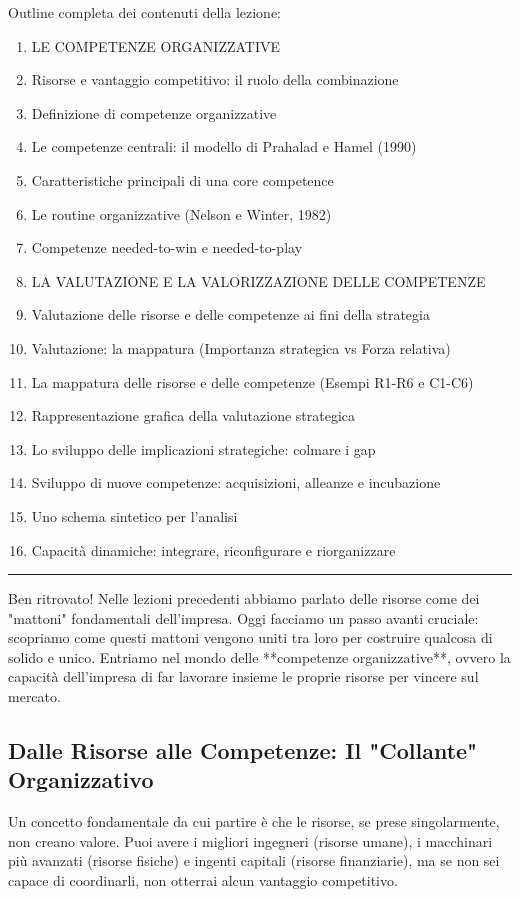\documentclass[a4paper,10pt]{article}
\begin{document}
Outline completa dei contenuti della lezione:
{\small
\begin{enumerate}
\item LE COMPETENZE ORGANIZZATIVE
\item Risorse e vantaggio competitivo: il ruolo della combinazione
\item Definizione di competenze organizzative
\item Le competenze centrali: il modello di Prahalad e Hamel (1990)
\item Caratteristiche principali di una core competence
\item Le routine organizzative (Nelson e Winter, 1982)
\item Competenze needed-to-win e needed-to-play
\item LA VALUTAZIONE E LA VALORIZZAZIONE DELLE COMPETENZE
\item Valutazione delle risorse e delle competenze ai fini della strategia
\item Valutazione: la mappatura (Importanza strategica vs Forza relativa)
\item La mappatura delle risorse e delle competenze (Esempi R1-R6 e C1-C6)
\item Rappresentazione grafica della valutazione strategica
\item Lo sviluppo delle implicazioni strategiche: colmare i gap
\item Sviluppo di nuove competenze: acquisizioni, alleanze e incubazione
\item Uno schema sintetico per l’analisi
\item Capacità dinamiche: integrare, riconfigurare e riorganizzare
\end{enumerate}
}
\hrule
\vspace{0.5cm}

Ben ritrovato! Nelle lezioni precedenti abbiamo parlato delle risorse come dei "mattoni" fondamentali dell'impresa. Oggi facciamo un passo avanti cruciale: scopriamo come questi mattoni vengono uniti tra loro per costruire qualcosa di solido e unico. Entriamo nel mondo delle **competenze organizzative**, ovvero la capacità dell'impresa di far lavorare insieme le proprie risorse per vincere sul mercato.

\subsection*{Dalle Risorse alle Competenze: Il "Collante" Organizzativo}

Un concetto fondamentale da cui partire è che le risorse, se prese singolarmente, non creano valore. Puoi avere i migliori ingegneri (risorse umane), i macchinari più avanzati (risorse fisiche) e ingenti capitali (risorse finanziarie), ma se non sei capace di coordinarli, non otterrai alcun vantaggio competitivo.
\end{document}
